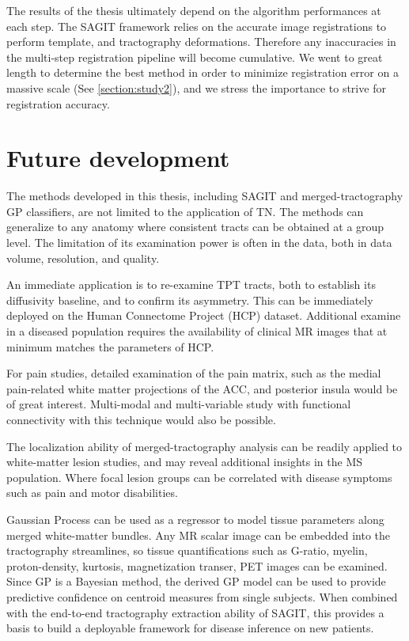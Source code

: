 The results of the thesis ultimately depend on the algorithm performances at each step. The SAGIT framework relies on the accurate image registrations to perform template, and tractography deformations. Therefore any inaccuracies in the multi-step registration pipeline will become cumulative. We went to great length to determine the best method in order to minimize registration error on a massive scale (See \ref{section:study2}), and we stress the importance to strive for registration accuracy. 



\section{Future development}

The methods developed in this thesis, including SAGIT and merged-tractography GP classifiers,  are not limited to the application of TN. The methods can generalize to any anatomy where consistent tracts can be obtained at a group level. The limitation of its examination power is often in the data, both in data volume, resolution, and quality. 

An immediate application is to re-examine TPT tracts, both to establish its diffusivity baseline, and to confirm its asymmetry. This can be immediately deployed on the Human Connectome Project (HCP) dataset. Additional examine in a diseased population requires the availability of clinical MR images that at minimum matches the parameters of HCP. 

For pain studies, detailed examination of the pain matrix, such as the medial pain-related white matter projections of the ACC, and posterior insula would be of great interest. Multi-modal and multi-variable study with functional connectivity with this technique would also be possible. 

The localization ability of merged-tractography analysis can be readily applied to white-matter lesion studies, and may reveal additional insights in the MS population. Where focal lesion groups can be correlated with disease symptoms such as pain and motor disabilities. 

Gaussian Process can be used as a regressor to model tissue parameters along merged white-matter bundles. Any MR scalar image can be embedded into the tractography streamlines, so tissue quantifications such as G-ratio, myelin, proton-density, kurtosis, magnetization transer, PET images can be examined. Since GP is a Bayesian method, the derived GP model can be used to provide predictive confidence on centroid measures from single subjects. When combined with the end-to-end tractography extraction ability of SAGIT, this provides a basis to build a deployable framework for disease inference on new patients. 

